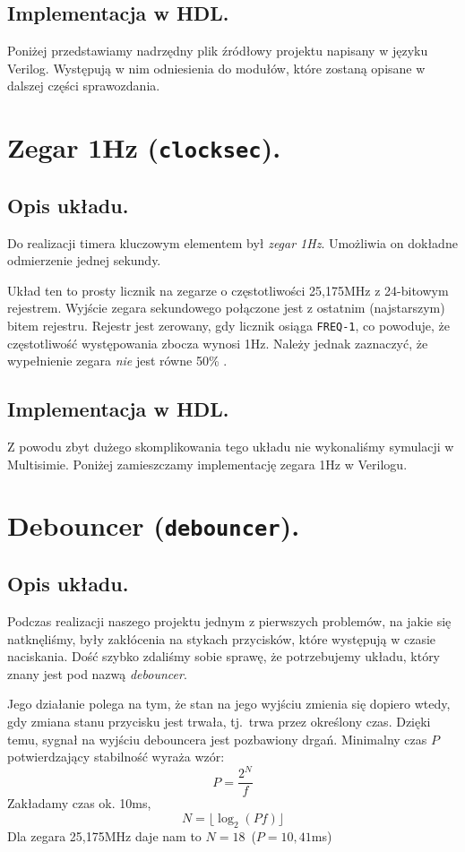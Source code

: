 \documentclass[a4paper,oneside]{report}
\newcommand{\clocksec}{\texttt{clock\textunderscore sec}}
\newcommand{\debouncer}{\texttt{debouncer}}
\begin{document}
\subsection{Implementacja w HDL.}
Poniżej przedstawiamy nadrzędny plik źródłowy projektu napisany w
języku Verilog. Występują w nim odniesienia do modułów, które
zostaną opisane w dalszej części sprawozdania.


\section{Zegar 1Hz (\clocksec).}
\subsection{Opis układu.}
Do realizacji timera kluczowym elementem był \emph{zegar 1Hz}.
Umożliwia on dokładne odmierzenie jednej sekundy.

Układ ten to prosty licznik na zegarze o częstotliwości 25,175MHz
z 24-bitowym rejestrem. Wyjście zegara sekundowego połączone
jest z ostatnim (najstarszym) bitem rejestru. Rejestr jest
zerowany, gdy licznik osiąga \texttt{FREQ-1}, co powoduje, że
częstotliwość występowania zbocza wynosi 1Hz. Należy jednak
zaznaczyć, że wypełnienie zegara \emph{nie} jest równe 50\% .
\subsection{Implementacja w HDL.}
Z powodu zbyt dużego skomplikowania tego układu nie wykonaliśmy
symulacji w Multisimie. Poniżej zamieszczamy implementację zegara
1Hz w Verilogu.


\section{Debouncer (\debouncer).}
\subsection{Opis układu.}
Podczas realizacji naszego projektu jednym z pierwszych problemów,
na jakie się natknęliśmy, były zakłócenia na stykach przycisków,
które występują w czasie naciskania. Dość szybko zdaliśmy sobie
sprawę, że potrzebujemy układu, który znany jest pod nazwą
\emph{debouncer}.

Jego działanie polega na tym, że stan na jego wyjściu zmienia się
dopiero wtedy, gdy zmiana stanu przycisku jest trwała, tj.\
trwa przez określony czas. Dzięki temu, sygnał na wyjściu
debouncera jest pozbawiony drgań. Minimalny czas $P$ potwierdzający
stabilność wyraża wzór:
$$
P = \frac{2^N}{f}
$$
Zakładamy czas ok. 10ms,
$$
N = \lfloor\log_2(Pf)\rfloor
$$
Dla zegara 25,175MHz daje nam to $N=18$\ ($P=10,41$ms)
\end{document}
